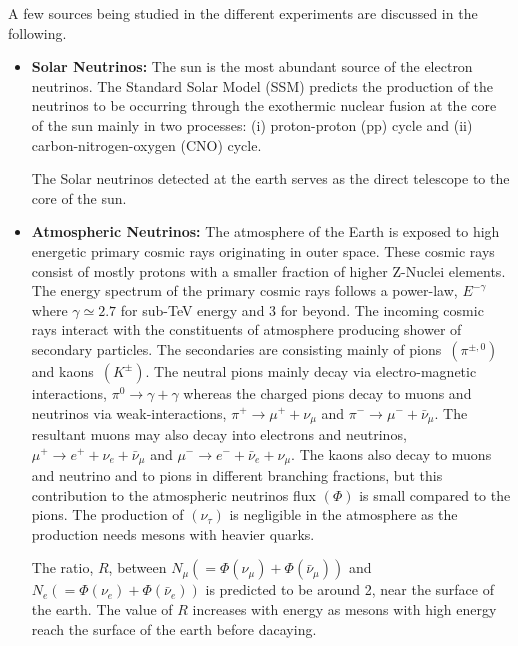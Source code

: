 A few sources being studied in the different experiments are discussed in the following.

\begin{itemize}
\item \textbf{Solar Neutrinos:} The sun is the most abundant source of the electron neutrinos. The Standard Solar Model (SSM)\cite{SSM} predicts the production of the neutrinos to be occurring through the exothermic nuclear fusion at the core of the sun mainly in two processes: (i) proton-proton (pp) cycle and (ii) carbon-nitrogen-oxygen (CNO) cycle.

  The Solar neutrinos detected at the earth serves as the direct telescope to the core of the sun.
  
\item \textbf{Atmospheric Neutrinos:} The atmosphere of the Earth is exposed to high energetic primary cosmic rays originating in outer space. These cosmic rays consist of mostly protons with a smaller fraction of higher \mbox{Z-Nuclei} elements\cite{cosmic1}. The energy spectrum of the primary cosmic rays follows a power-law, $E^{-\gamma}$ where $\gamma\simeq 2.7$ for sub-TeV energy and 3 for beyond.  The incoming cosmic rays interact with the constituents of atmosphere producing shower of secondary particles\cite{thebook}. The secondaries are consisting mainly of \mbox{pions $\left(\pi^{\pm,0}\right)$} and \mbox{kaons $\left(K^{\pm}\right)$}. The neutral pions mainly decay via electro-magnetic interactions, $\pi^0 \rightarrow \gamma+\gamma$ whereas the charged pions decay to muons and neutrinos via weak-interactions, $\pi^+ \rightarrow \mu^+ + \nu_{\mu}$ and $\pi^- \rightarrow \mu^- + \bar{\nu}_{\mu}$. The resultant muons may also decay into electrons and neutrinos, $\mu^+ \rightarrow e^+ + \nu_{e} + \bar{\nu}_{\mu}$ and $\mu^- \rightarrow e^- + \bar{\nu}_{e} + \nu_{\mu}$.  The kaons also decay to muons and neutrino and to pions in different branching fractions, but this contribution to the atmospheric neutrinos flux $\left(\Phi\right)$ is small compared to the pions. The production of $\left(\nu_{\tau}\right)$ is negligible in the atmosphere as the production needs mesons with heavier quarks.

  The ratio, $R$, between $N_{\mu}\left(=\Phi\left(\nu_{\mu}\right)+\Phi\left(\bar{\nu}_{\mu}\right)\right)$ and $N_{e}\left(=\Phi\left(\nu_{e}\right)+\Phi\left(\bar{\nu}_{e}\right)\right)$ is predicted to be around 2, near the surface of the earth. The value of $R$ increases with energy as mesons with high energy reach the surface of the earth before dacaying.


\end{itemize}

